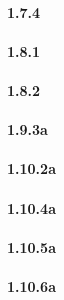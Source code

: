 \documentclass{article}
\begin{document}
\paragraph{1.7.4}
\paragraph{1.8.1}
\paragraph{1.8.2}
\paragraph{1.9.3a}
\paragraph{1.10.2a}
\paragraph{1.10.4a}
\paragraph{1.10.5a}
\paragraph{1.10.6a}
\end{document}
